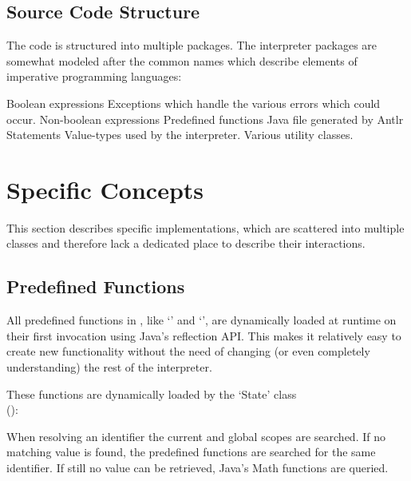 \subsection{Source Code Structure}\label{srcStructure}

The code is structured into multiple packages. The interpreter packages are somewhat modeled after the common names which describe elements of imperative programming languages:

\begin{itemize}
			{Boolean expressions}
			{Exceptions which handle the various errors which could occur.}
			{Non-boolean expressions}
			{Predefined functions}
			{Java file generated by Antlr}
			{Statements}
			{Value-types used by the interpreter.}
			{Various utility classes.}
\end{itemize}

\section{Specific Concepts}\label{specificConcepts}

This section describes specific implementations, which are scattered into multiple classes and therefore lack a dedicated place to describe their interactions.

\subsection{Predefined Functions}

All predefined functions in \setlX{}, like `' and `', are dynamically loaded at runtime on their first invocation using Java's reflection API. This makes it relatively easy to create new functionality without the need of changing (or even completely understanding) the rest of the interpreter.

These functions are dynamically loaded by the `State' class\\ ():

When resolving an identifier the current and global scopes are searched. If no matching value is found, the predefined functions are searched for the same identifier. If still no value can be retrieved, Java's Math functions are queried.

